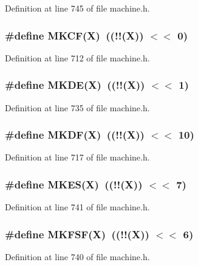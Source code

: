 Definition at line 745 of file machine.h.
\subsubsection[{MKCF}]{\setlength{\rightskip}{0pt plus 5cm}\#define MKCF(X)~((!!(X)) $<$$<$ 0)}\label{machine_8h_0f8d0abfc6d01a70b0336e0ac1b25de5}




Definition at line 712 of file machine.h.
\subsubsection[{MKDE}]{\setlength{\rightskip}{0pt plus 5cm}\#define MKDE(X)~((!!(X)) $<$$<$ 1)}\label{machine_8h_b95fb5dc856a0bbb61a69954fa939dce}




Definition at line 735 of file machine.h.
\subsubsection[{MKDF}]{\setlength{\rightskip}{0pt plus 5cm}\#define MKDF(X)~((!!(X)) $<$$<$ 10)}\label{machine_8h_b3b12453be283dd7d7652be71fb586d9}




Definition at line 717 of file machine.h.
\subsubsection[{MKES}]{\setlength{\rightskip}{0pt plus 5cm}\#define MKES(X)~((!!(X)) $<$$<$ 7)}\label{machine_8h_94e445515b5dd934a4c7473aaad34524}




Definition at line 741 of file machine.h.
\subsubsection[{MKFSF}]{\setlength{\rightskip}{0pt plus 5cm}\#define MKFSF(X)~((!!(X)) $<$$<$ 6)}\label{machine_8h_6fe5d9fa42198b4a189644232dd96398}




Definition at line 740 of file machine.h.
